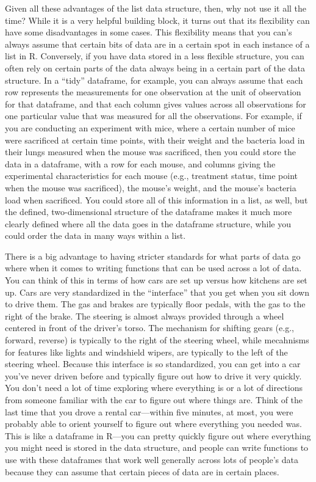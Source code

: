 \documentclass[]{tufte-book}
\begin{document}
Given all these advantages of the list data structure, then, why not use it all
the time? While it is a very helpful building block, it turns out that its flexibility
can have some disadvantages in some cases. This flexibility means that you can's
always assume that certain bits of data are in a certain spot in each instance
of a list in R. Conversely, if you have data stored in a less flexible structure,
you can often rely on certain parts of the data always being in a certain part of
the data structure. In a ``tidy'' dataframe, for example, you can always assume
that each row represents the measurements for one observation at the unit of
observation for that dataframe, and that each column gives values across all
observations for one particular value that was measured for all the observations.
For example, if you are conducting an experiment with mice, where a certain number
of mice were sacrificed at certain time points, with their weight and the bacteria
load in their lungs measured when the mouse was sacrificed, then you could store
the data in a dataframe, with a row for each mouse, and columns giving the
experimental characteristics for each mouse (e.g., treatment status, time point
when the mouse was sacrificed), the mouse's weight, and the mouse's bacteria
load when sacrificed. You could store all of this information in a list, as
well, but the defined, two-dimensional structure of the dataframe makes it much
more clearly defined where all the data goes in the dataframe structure, while
you could order the data in many ways within a list.

There is a big advantage to having stricter standards for what parts of data go
where when it comes to writing functions that can be used across a lot of data.
You can think of this in terms of how cars are set up versus how kitchens are
set up. Cars are very standardized in the ``interface'' that you get when you sit
down to drive them. The gas and brakes are typically floor pedals, with the gas
to the right of the brake. The steering is almost always provided through a wheel
centered in front of the driver's torso. The mechanism for shifting gears (e.g.,
forward, reverse) is typically to the right of the steering wheel, while
mecahnisms for features like lights and windshield wipers, are typically to the
left of the steering wheel. Because this interface is so standardized, you can
get into a car you've never driven before and typically figure out how to
drive it very quickly. You don't need a lot of time exploring where everything
is or a lot of directions from someone familiar with the car to figure out where
things are. Think of the last time that you drove a rental car---within five minutes,
at most, you were probably able to orient yourself to figure out where everything
you needed was. This is like a dataframe in R---you can pretty quickly figure out
where everything you might need is stored in the data structure, and people can
write functions to use with these dataframes that work well generally across lots
of people's data because they can assume that certain pieces of data are in
certain places.
\end{document}
